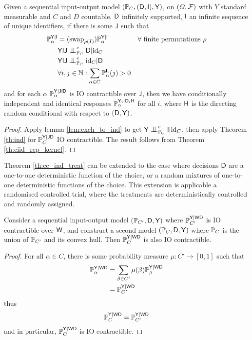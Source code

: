 \begin{theorem}\label{th:cc_ind_treat}
Given a sequential input-output model $(\mathbb{P}_C,(\mathsf{D},\mathsf{I}),\mathsf{Y})$, on $(\Omega,\mathcal{F})$ with $Y$ standard measurable and $C$ and $D$ countable, $\mathsf{D}$ infinitely supported, $\mathsf{I}$ an infinite sequence of unique identifiers, if there is some $\mathsf{J}$ such that
\begin{align}
    \prob{P}_\alpha^{\RV{Y}|\RV{I}} &= (\text{swap}_{\rho(I)})\prob{P}_\alpha^{\RV{Y}|\RV{I}}&\forall \text{ finite permutations }\rho\\
    &\RV{YIJ}\CI^e_{\prob{P}_C} \RV{D}|\text{id}_C\\
    &\RV{YIJ}\CI^e_{\prob{P}_C} \text{id}_C|\RV{D}\\
    &\forall i,j\in \mathbb{N}: \sum_{\alpha\in C} \prob{P}_\alpha^{\RV{I}_i}(j)>0
\end{align}
and for each $\alpha$ $\mathbb{P}_\alpha^{\mathsf{Y}|\mathsf{JID}}$ is IO contractible over $\mathsf{J}$, then we have conditionally independent and identical responses $\mathbb{P}_\alpha^{\mathsf{Y}_i|\mathsf{D}_i\mathsf{H}}$ for all $i$, where $\mathsf{H}$ is the directing random conditional with respect to $(\mathsf{D},\mathsf{Y})$.
\end{theorem}

\begin{proof}
Apply lemma \ref{lem:exch_to_ind} to get $\RV{Y}\CI^e_{\prob{P}_C} \RV{I} | \text{id}_C$, then apply Theorem \ref{th:ind} for $\mathbb{P}_C^{\mathsf{Y}|\mathsf{J}\mathsf{D}}$ IO contractible. The result follows from Theorem \ref{th:ciid_rep_kernel}.
\end{proof}

Theorem \ref{th:cc_ind_treat} can be extended to the case where decisions $\mathsf{D}$ are a one-to-one deterministic function of the choice, or a random mixtures of one-to-one deterministic functions of the choice. This extension is applicable a randomised controlled trial, where the treatments are deterministically controlled and randomly assigned.

\begin{theorem}\label{cor:extend_to_randomised}
Consider a sequential input-output model $(\mathbb{P}_{C'},\mathsf{D},\mathsf{Y})$ where $\mathbb{P}_{C'}^{\mathsf{Y}|\mathsf{WD}}$ is IO contractible over $\mathsf{W}$, and construct a second model $(\mathbb{P}_{C},\mathsf{D},\mathsf{Y})$ where $\mathbb{P}_C$ is the union of $\mathbb{P}_{C'}$ and its convex hull. Then $\mathbb{P}_{C}^{\mathsf{Y}|\mathsf{WD}}$ is also IO contractible.
\end{theorem}

\begin{proof}
For all $\alpha\in C$, there is some probability measure $\mu:C'\to [0,1]$ such that
\begin{align}
    \mathbb{P}_\alpha^{\mathsf{Y}|\mathsf{WD}} &= \sum_{\beta\in C'} \mu(\beta) \mathbb{P}_\beta^{\mathsf{Y}|\mathsf{WD}}\\
    &= \mathbb{P}_{C'}^{\mathsf{Y}|\mathsf{WD}}
\end{align}
thus
\begin{align}
    \mathbb{P}_C^{\mathsf{Y}|\mathsf{WD}} = \mathbb{P}_{C'}^{\mathsf{Y}|\mathsf{WD}}
\end{align}
and in particular, $\mathbb{P}_C^{\mathsf{Y}|\mathsf{WD}}$ is IO contractible.
\end{proof}

